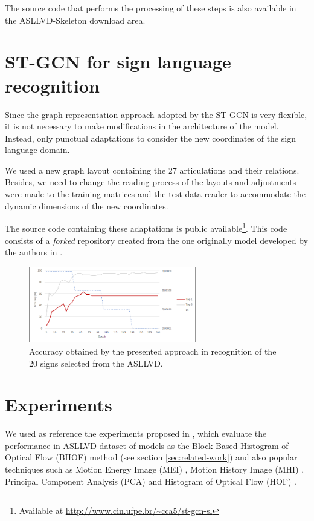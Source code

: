The source code that performs the processing of these steps is also available in the ASLLVD-Skeleton download area.


\section{ST-GCN for sign language recognition} 
\label{sec:st-gcn-for-sl-recognition}

Since the graph representation approach adopted by the ST-GCN is very flexible, it is not necessary to make modifications in the architecture of the model. Instead, only punctual adaptations to consider the new coordinates of the sign language domain.

We used a new graph layout containing the 27 articulations and their relations. Besides, we need to change the reading process of the layouts and adjustments were made to the training matrices and the test data reader to accommodate the dynamic dimensions of the new coordinates.

The source code containing these adaptations is public available\footnote{
    Available at \url{http://www.cin.ufpe.br/~cca5/st-gcn-sl}
}. This code consists of a \textit{forked} repository created from the one originally model developed by the authors in \cite{st-gcn-2018}.


\begin{figure}[!t]
    \centering
    \includegraphics[width=0.65\textwidth]{images/results_20}
    \caption{Accuracy obtained by the presented approach in recognition of the 20 signs selected from the ASLLVD.}
    \label{fig:training-asllvd-20}
\end{figure}


\section{Experiments} 
\label{sec:experiments}

We used as reference the experiments proposed in \cite{lim-2016}, which evaluate the performance in ASLLVD dataset of models as the Block-Based Histogram of Optical Flow (BHOF) method (see section \ref{sec:related-work}) and also popular techniques such as Motion Energy Image (MEI) \cite{athitsos-asllvd-2008}, Motion History Image (MHI) \cite{babu-2004}, Principal Component Analysis (PCA) \cite{dreuw-2012} and Histogram of Optical Flow (HOF) \cite{laptev-2008}.

